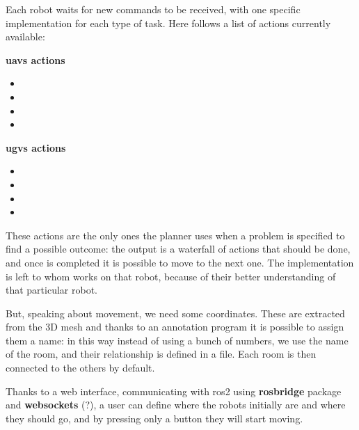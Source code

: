 Each robot waits for new commands to be received, with one specific implementation for each type of task. Here follows a list of actions currently available:

\bigskip

\begin{minipage}[h]{0.45\textwidth}
  \centering
  \textbf{\acrshort{uav}s actions}
  \begin{itemize}
    \centering
    \item {}
    \item {}    
    \item {}
    \item {}
  \end{itemize}
\end{minipage}
\begin{minipage}[h]{0.45\textwidth}
  \centering
  \textbf{\acrshort{ugv}s actions}
    \begin{itemize}
      \centering
      \item {}
      \item {}
      \item {}
      \item {}
    \end{itemize}
\end{minipage}

\bigskip

These actions are the only ones the planner uses when a problem is specified to find a possible outcome: the output is a waterfall of actions that should be done, and once is completed it is possible to move to the next one. The implementation is left to whom works on that robot, because of their better understanding of that particular robot.

But, speaking about movement, we need some coordinates. These are extracted from the 3D mesh and thanks to an annotation program it is possible to assign them a name: in this way instead of using a bunch of numbers, we use the name of the room, and their relationship is defined in a file. Each room is then connected to the others by default.

Thanks to a web interface, communicating with \acrshort{ros}2 using \textbf{rosbridge} package and \textbf{websockets} (?), a user can define where the robots initially are and where they should go, and by pressing only a button they will start moving.   

